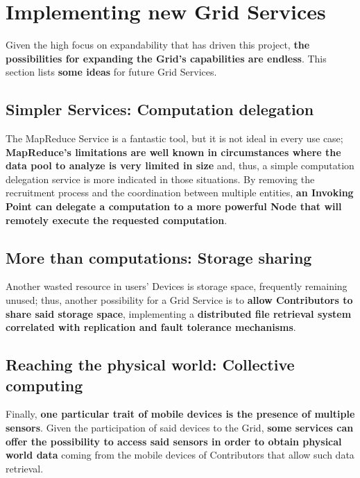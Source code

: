 \section{Implementing new Grid Services}
Given the high focus on expandability that has driven this project, \textbf{the possibilities for expanding the Grid's capabilities are endless}. This section lists \textbf{some ideas} for future Grid Services.

\subsection{Simpler Services: Computation delegation}
The MapReduce Service is a fantastic tool, but it is not ideal in every use case; \textbf{MapReduce's limitations are well known in circumstances where the data pool to analyze is very limited in size} and, thus, a simple computation delegation service is more indicated in those situations. By removing the recruitment process and the coordination between multiple entities, \textbf{an Invoking Point can delegate a computation to a more powerful Node that will remotely execute the requested computation}.

\subsection{More than computations: Storage sharing}
Another wasted resource in users' Devices is storage space, frequently remaining unused; thus, another possibility for a Grid Service is to \textbf{allow Contributors to share said storage space}, implementing a \textbf{distributed file retrieval system correlated with replication and fault tolerance mechanisms}.

\subsection{Reaching the physical world: Collective computing}
Finally, \textbf{one particular trait of mobile devices is the presence of multiple sensors}. Given the participation of said devices to the Grid, \textbf{some services can offer the possibility to access said sensors in order to obtain physical world data} coming from the mobile devices of Contributors that allow such data retrieval. 